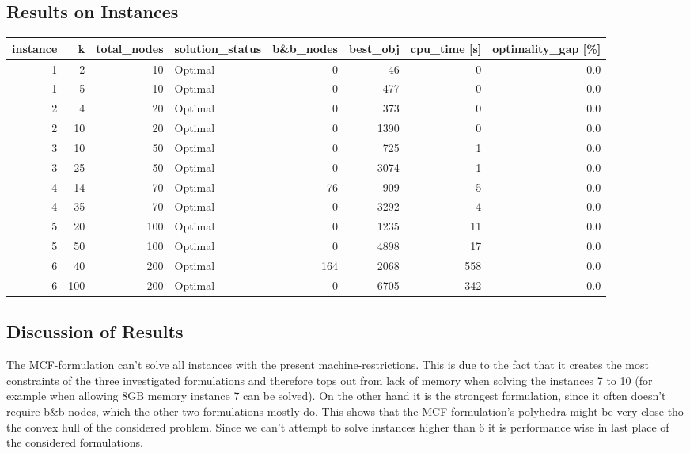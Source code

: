 \documentclass[11pt]{article}
\begin{document}
\subsection{Results on Instances}
\begin{tabular}{rrrlrrrr}
\toprule
 instance &    k &  total\_nodes & solution\_status &  b\&b\_nodes &  best\_obj &  cpu\_time [s] &  optimality\_gap [\%] \\
\midrule
        1 &    2 &           10 &         Optimal &          0 &        46 &             0 &                 0.0 \\
        1 &    5 &           10 &         Optimal &          0 &       477 &             0 &                 0.0 \\
        2 &    4 &           20 &         Optimal &          0 &       373 &             0 &                 0.0 \\
        2 &   10 &           20 &         Optimal &          0 &      1390 &             0 &                 0.0 \\
        3 &   10 &           50 &         Optimal &          0 &       725 &             1 &                 0.0 \\
        3 &   25 &           50 &         Optimal &          0 &      3074 &             1 &                 0.0 \\
        4 &   14 &           70 &         Optimal &         76 &       909 &             5 &                 0.0 \\
        4 &   35 &           70 &         Optimal &          0 &      3292 &             4 &                 0.0 \\
        5 &   20 &          100 &         Optimal &          0 &      1235 &            11 &                 0.0 \\
        5 &   50 &          100 &         Optimal &          0 &      4898 &            17 &                 0.0 \\
        6 &   40 &          200 &         Optimal &        164 &      2068 &           558 &                 0.0 \\
        6 &  100 &          200 &         Optimal &          0 &      6705 &           342 &                 0.0 \\
\bottomrule
\end{tabular}
\subsection{Discussion of Results}
The MCF-formulation can't solve all instances with the present machine-restrictions. This is due to the fact that it creates the most constraints of the three investigated formulations and therefore tops out from lack of memory when solving the instances 7 to 10 (for example when allowing 8GB memory instance 7 can be solved). On the other hand it is the strongest formulation, since it often doesn't require b\&b nodes, which the other two formulations mostly do. This shows that the MCF-formulation's polyhedra might be very close tho the convex hull of the considered problem. Since we can't attempt to solve instances higher than 6 it is performance wise in last place of the considered formulations.
\end{document}
